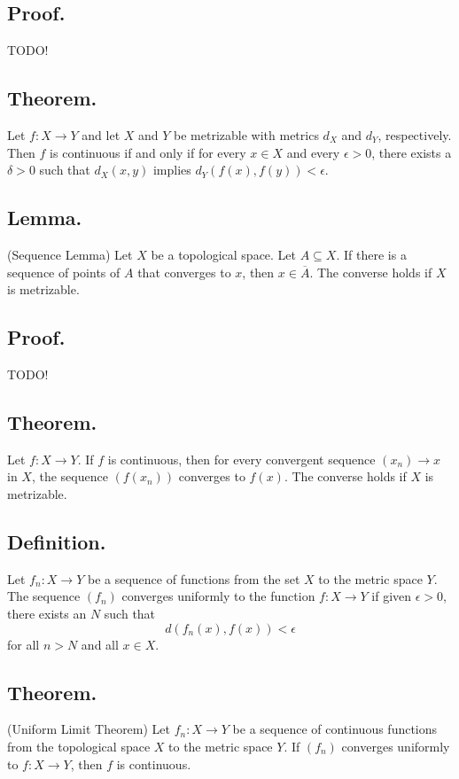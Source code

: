 \documentclass[titlepage]{article}
\begin{document}
\subsection{Proof.} TODO!

\subsection{Theorem.} Let $f: X \to Y$ and let $X$ and $Y$ be metrizable with metrics $d_{X}$ and $d_{Y}$, respectively. Then $f$ is continuous if and only if for every $x \in X$ and every $\epsilon > 0$, there exists a $\delta > 0$ such that $d_{X}(x, y)$ implies $d_{Y}(f(x), f(y)) < \epsilon$.

\subsection{Lemma.} (Sequence Lemma) Let $X$ be a topological space. Let $A \subseteq X$. If there is a sequence of points of $A$ that converges to $x$, then $x \in \overline{A}$. The converse holds if $X$ is metrizable.

\subsection{Proof.} TODO!

\subsection{Theorem.} Let $f: X \to Y$. If $f$ is continuous, then for every convergent sequence $(x_{n}) \to x$ in $X$, the sequence $(f(x_{n}))$ converges to $f(x)$. The converse holds if $X$ is metrizable.

\subsection{Definition.} Let $f_{n}: X \to Y$ be a sequence of functions from the set $X$ to the metric space $Y$. The sequence $(f_{n})$ converges uniformly to the function $f: X \to Y$ if given $\epsilon > 0$, there exists an $N$ such that 
$$d(f_{n}(x), f(x)) < \epsilon$$
for all $n > N$ and all $x \in X$.

\subsection{Theorem.} (Uniform Limit Theorem) Let $f_{n}: X \to Y$ be a sequence of continuous functions from the topological space $X$ to the metric space $Y$. If $(f_{n})$ converges uniformly to $f: X \to Y$, then $f$ is continuous.
\end{document}
